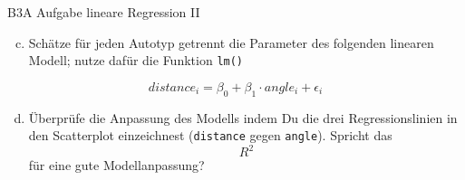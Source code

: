 \documentclass[ignorenonframetext,]{beamer}
\providecommand{\tightlist}{%
  \setlength{\itemsep}{0pt}\setlength{\parskip}{0pt}}
\begin{document}
\begin{frame}[fragile]{B3A Aufgabe lineare Regression II}
\protect\hypertarget{b3a-aufgabe-lineare-regression-ii}{}

\begin{enumerate}
[(a)]
\setcounter{enumi}{2}
\tightlist
\item
  Schätze für jeden Autotyp getrennt die Parameter des folgenden
  linearen Modell; nutze dafür die Funktion \texttt{lm()}
\end{enumerate}

\[ distance_i= \beta_0 + \beta_1 \cdot angle_i + \epsilon_i\]

\begin{enumerate}
[(a)]
\setcounter{enumi}{3}
\tightlist
\item
  Überprüfe die Anpassung des Modells indem Du die drei
  Regressionslinien in den Scatterplot einzeichnest (\texttt{distance}
  gegen \texttt{angle}). Spricht das \[ R^2 \] für eine gute
  Modellanpassung?
\end{enumerate}

\end{frame}
\end{document}
